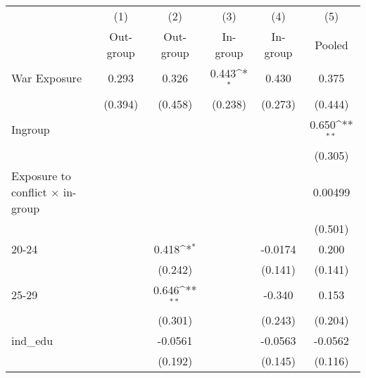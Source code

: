 {
\def\sym#1{\ifmmode^{#1}\else\(^{#1}\)\fi}
\begin{tabular}{l*{5}{c}}
\hline\hline
                    &\multicolumn{1}{c}{(1)}&\multicolumn{1}{c}{(2)}&\multicolumn{1}{c}{(3)}&\multicolumn{1}{c}{(4)}&\multicolumn{1}{c}{(5)}\\
                    &\multicolumn{1}{c}{Out-group}&\multicolumn{1}{c}{Out-group}&\multicolumn{1}{c}{In-group}&\multicolumn{1}{c}{In-group}&\multicolumn{1}{c}{Pooled}\\
\hline
War Exposure        &       0.293         &       0.326         &       0.443\sym{*}  &       0.430         &       0.375         \\
                    &     (0.394)         &     (0.458)         &     (0.238)         &     (0.273)         &     (0.444)         \\
[1em]
Ingroup             &                     &                     &                     &                     &       0.650\sym{**} \\
                    &                     &                     &                     &                     &     (0.305)         \\
[1em]
Exposure to conflict × in-group &                     &                     &                     &                     &     0.00499         \\
                    &                     &                     &                     &                     &     (0.501)         \\
[1em]
20-24               &                     &       0.418\sym{*}  &                     &     -0.0174         &       0.200         \\
                    &                     &     (0.242)         &                     &     (0.141)         &     (0.141)         \\
[1em]
25-29               &                     &       0.646\sym{**} &                     &      -0.340         &       0.153         \\
                    &                     &     (0.301)         &                     &     (0.243)         &     (0.204)         \\
[1em]
ind\_edu             &                     &     -0.0561         &                     &     -0.0563         &     -0.0562         \\
                    &                     &     (0.192)         &                     &     (0.145)         &     (0.116)         \\

\end{tabular}}
